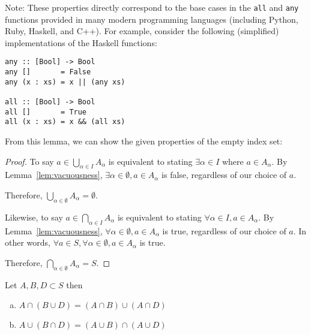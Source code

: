 Note: These properties directly correspond to the base cases in the \texttt{all} and \texttt{any} functions provided in many modern programming languages
(including Python, Ruby, Haskell, and C++). For example, consider the following (simplified) implementations of the Haskell functions:

\begin{verbatim}
any :: [Bool] -> Bool
any []       = False
any (x : xs) = x || (any xs)

all :: [Bool] -> Bool
all []       = True
all (x : xs) = x && (all xs)
\end{verbatim}

From this lemma, we can show the given properties of the empty index set:

\begin{proof}
	To say $a \in \bigcup_{\alpha \in I} A_\alpha$ is equivalent to stating $\exists \alpha \in I$ where $a \in A_\alpha$.
	By Lemma~\ref{lem:vacuousness}, $\exists \alpha \in \emptyset, a \in A_\alpha$ is false, regardless of our choice of $a$.

	Therefore, $\bigcup_{\alpha \in \emptyset} A_\alpha = \emptyset$.

	Likewise, to say $a \in \bigcap_{\alpha \in I} A_\alpha$ is equivalent to stating $\forall \alpha \in I, a \in A_\alpha$.
	By Lemma~\ref{lem:vacuousness}, $\forall \alpha \in \emptyset, a \in A_\alpha$ is true, regardless of our choice of $a$.
	In other words, $\forall a \in S, \forall \alpha \in \emptyset, a \in A_\alpha$ is true.

	Therefore, $\bigcap_{\alpha \in \emptyset} A_\alpha = S$.
\end{proof}

\begin{problem}[2]
	Let $A, B, D \subset S$ then \\
	\begin{enumerate}[(a)]
		\item $A \cap (B \cup D) = (A \cap B) \cup (A \cap D)$
		\item $A \cup (B \cap D) = (A \cup B) \cap (A \cup D)$
	\end{enumerate}
\end{problem}


